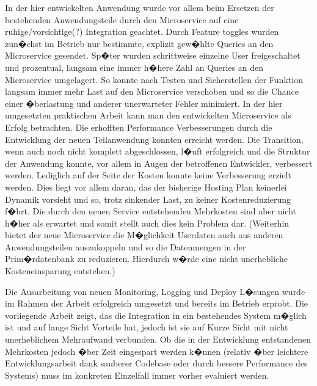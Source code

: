 In der hier entwickelten Anwendung wurde vor allem beim Ersetzen der bestehenden Anwendungsteile durch den Microservice auf eine ruhige/vorsichtige(?) Integration geachtet. Durch Feature toggles wurden zun�chst im Betrieb nur bestimmte, explizit gew�hlte Queries an den Microservice gesendet. Sp�ter wurden schrittweise einzelne User freigeschaltet und prozentual, langsam eine immer h�here Zahl an Queries an den Microservice umgelagert. So konnte nach Testen und Sicherstellen der Funktion langsam immer mehr Last auf den Microservice verschoben und so die Chance einer �berlastung und anderer unerwarteter Fehler minimiert.
In der hier umgesetzten praktischen Arbeit kann man den entwickelten Microservice als Erfolg betrachten. Die erhofften Performance Verbesserungen durch die Entwicklung der neuen Teilanwendung konnten erreicht werden. Die Transition, wenn auch noch nicht komplett abgeschlossen, l�uft erfolgreich und die Struktur der Anwendung konnte, vor allem in Augen der betroffenen Entwickler, verbessert werden. Lediglich auf der Seite der Kosten konnte keine Verbesserung erzielt werden. Dies liegt vor allem daran, das der bisherige Hosting Plan keinerlei Dynamik vorsieht und so, trotz sinkender Last, zu keiner Kostenreduzierung f�hrt. Die durch den neuen Service entstehenden Mehrkosten sind aber nicht h�her als erwartet und somit stellt auch dies kein Problem dar. (Weiterhin bietet der neue Microservice die M�glichkeit Userdaten auch aus anderen Anwendungsteilen auszukoppeln und so die Datenmengen in der Prim�rdatenbank zu reduzieren. Hierdurch w�rde eine nicht unerhebliche Kosteneinsparung entstehen.)

Die Ausarbeitung von neuen Monitoring, Logging und Deploy L�sungen wurde im Rahmen der Arbeit erfolgreich umgesetzt und bereits im Betrieb erprobt.
Die vorliegende Arbeit zeigt, das die Integration in ein bestehendes System m�glich ist und auf lange Sicht Vorteile hat, jedoch ist sie auf Kurze Sicht mit nicht unerheblichem Mehraufwand verbunden. Ob die in der Entwicklung entstandenen Mehrkosten jedoch �ber Zeit eingespart werden k�nnen (relativ �ber leichtere Entwicklungsarbeit dank sauberer Codebase oder durch bessere Performance des Systems) muss im konkreten Einzelfall immer vorher evaluiert werden.